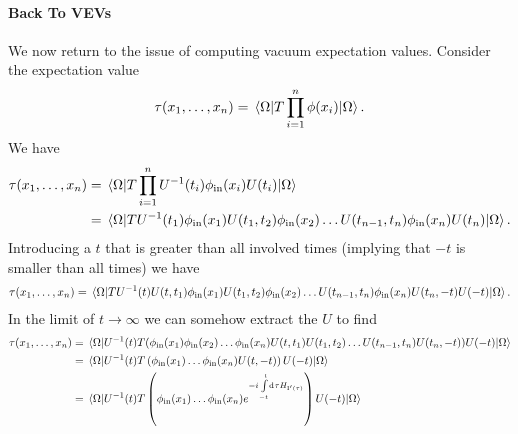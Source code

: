 \paragraph{Back To VEVs}
We now return to the issue of computing vacuum expectation values. Consider the expectation value
\begin{align*}
	\tau(x_{1}, \dots, x_{n}) = \expval{\ensuremath{T}\prod\limits_{i = 1}^{n}\phi(x_{i})}{\Omega}.
\end{align*}
We have
\begin{align*}
	\tau(x_{1}, \dots, x_{n}) &= \expval{\ensuremath{T}\prod\limits_{i = 1}^{n}U^{-1}(t_{i})\phi_{\text{in}}(x_{i})U(t_{i})}{\Omega} \\
	                          &= \expval{\ensuremath{T}U^{-1}(t_{1})\phi_{\text{in}}(x_{1})U(t_{1}, t_{2})\phi_{\text{in}}(x_{2})\dots U(t_{n - 1}, t_{n})\phi_{\text{in}}(x_{n})U(t_{n})}{\Omega}.
\end{align*}
Introducing a $t$ that is greater than all involved times (implying that $-t$ is smaller than all times) we have
\begin{align*}
	\tau(x_{1}, \dots, x_{n}) = \expval{\ensuremath{T}U^{-1}(t)U(t, t_{1})\phi_{\text{in}}(x_{1})U(t_{1}, t_{2})\phi_{\text{in}}(x_{2})\dots U(t_{n - 1}, t_{n})\phi_{\text{in}}(x_{n})U(t_{n}, -t)U(-t)}{\Omega}.
\end{align*}
In the limit of $t\to\infty$ we can somehow extract the $U$ to find
\begin{align*}
	\tau(x_{1}, \dots, x_{n}) &= \expval{U^{-1}(t)\ensuremath{T}(\phi_{\text{in}}(x_{1})\phi_{\text{in}}(x_{2})\dots \phi_{\text{in}}(x_{n})U(t, t_{1})U(t_{1}, t_{2})\dots U(t_{n - 1}, t_{n})U(t_{n}, -t))U(-t)}{\Omega} \\
	                          &= \expval{U^{-1}(t)\ensuremath{T}\left(\phi_{\text{in}}(x_{1})\dots \phi_{\text{in}}(x_{n})U(t, -t)\right)U(-t)}{\Omega} \\
	                          &= \expval{U^{-1}(t)\ensuremath{T}\left(\phi_{\text{in}}(x_{1})\dots \phi_{\text{in}}(x_{n})e^{-i\int\limits_{-t}^{t}\dd[]{\tau}H_{\text{I}\ensuremath{^{\prime}}(\tau)}}\right)U(-t)}{\Omega}
\end{align*}

